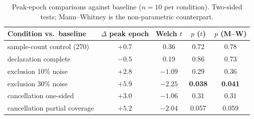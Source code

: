\documentclass{article} %
\begin{document}
\begin{table}[h]
\centering
\small
\begin{tabular}{lcccc}
\toprule
Condition vs.\ baseline & $\Delta$ peak epoch & Welch $t$ & $p$ ($t$) & $p$ (M--W) \\
\midrule
sample-count control (270) & $+0.7$ & 0.36 & 0.72 & 0.78 \\
declaration complete & $-0.5$ & 0.19 & 0.86 & 0.73 \\
exclusion 10\% noise & $+2.8$ & $-1.09$ & 0.29 & 0.36 \\
exclusion 30\% noise & $+5.9$ & $-2.25$ & \textbf{0.038} & \textbf{0.041} \\
cancellation one-sided & $+3.0$ & $-1.06$ & 0.31 & 0.31 \\
cancellation partial coverage & $+5.2$ & $-2.04$ & 0.057 & 0.059 \\
\bottomrule
\end{tabular}
\caption{Peak-epoch comparisons against baseline ($n = 10$ per
condition). Two-sided tests; Mann--Whitney is the non-parametric
counterpart.}
\label{tab:stats}
\end{table}
\end{document}
